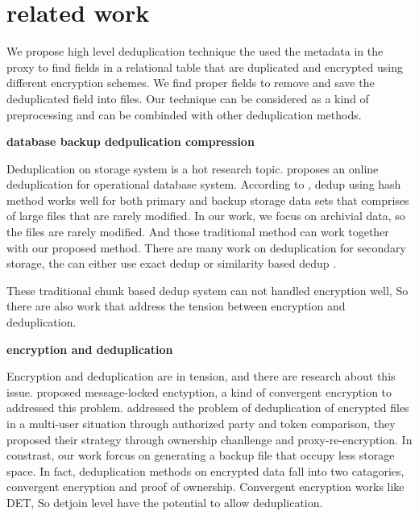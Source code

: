 \section{related work}

We propose high level deduplication technique the used the metadata in the proxy to find fields in a relational table that are duplicated and encrypted using different encryption schemes. We find proper fields to remove and save the deduplicated field into files. Our technique can be considered as a kind of preprocessing and can be combinded with other deduplication methods.


\textbf{database backup dedpulication compression}

Deduplication on storage system is a hot research topic\citep{paulo2014survey}.\citep{xu2017online} proposes an online deduplication for operational database system. According to \citep{xu2017online}, dedup using hash method works well for both primary and backup storage data sets that comprises of large files that are rarely modified. In our work, we focus on archivial data, so the files are rarely modified. And those traditional method can work together with our proposed method. There are many work on deduplication for secondary storage, the can either use exact dedup\citep{dubnicki2009hydrastor} or similarity based dedup\citep{xu2015reducing} \citep{aronovich2009design}\citep{you2005deep}.

These traditional chunk based dedup system can not handled encryption well, So there are also work that address the tension between encryption and deduplication.

\textbf{encryption and deduplication}

Encryption and deduplication are in tension, and there are research about this issue.\citep{bellare2013message} \citep{puzio2015perfectdedup} proposed message-locked enctyption, a kind of convergent encryption to addressed this problem. \citep{yan2016deduplication} addressed the problem of deduplication of encrypted files in a multi-user situation through authorized party and token comparison, they proposed their strategy through ownership chanllenge and proxy-re-encryption. In constrast, our work forcus on generating a backup file that occupy less storage space. In fact, deduplication methods on encrypted data fall into two catagories, convergent encryption and proof of ownership\citep{akhila2016study}. Convergent encryption works like DET, So detjoin level have the potential to allow deduplication.

